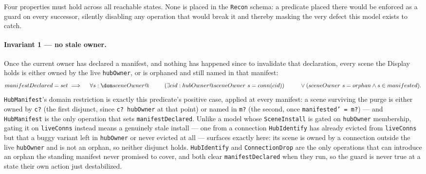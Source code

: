 \documentclass[a4paper,10pt,fleqn]{article}
\begin{document}
Four properties must hold across all reachable states.  None is placed in
the \texttt{Recon} schema: a predicate placed there would be enforced as a
guard on every successor, silently disabling any operation that would
break it and thereby masking the very defect this model exists to catch.

\paragraph{Invariant 1 --- no stale owner.}
Once the current owner has declared a manifest, and nothing has happened
since to invalidate that declaration, every scene the Display holds is
either owned by the live \texttt{hubOwner}, or is orphaned and still named
in that manifest:
\[
  manifestDeclared = set \implies \\
  \quad~ \forall s : \dom sceneOwner @ \\
  \quad~ \quad~ (\exists cid : hubOwner @ sceneOwner~s = conn(cid)) \\
  \quad~ \quad~ \lor (sceneOwner~s = orphan \land s \in manifested).
\]
\texttt{HubManifest}'s domain restriction is exactly this predicate's
positive case, applied at every manifest: a scene surviving the purge is
either owned by \texttt{c?} (the first disjunct, since
\texttt{c? \in hubOwner} at that point) or named in \texttt{m?} (the
second, once \texttt{manifested' = m?}) --- and \texttt{HubManifest} is the
only operation that sets \texttt{manifestDeclared}.  Unlike a model whose
\texttt{SceneInstall} is gated on \texttt{hubOwner} membership, gating it
on \texttt{liveConns} instead means a genuinely stale install --- one from
a connection \texttt{HubIdentify} has already evicted from
\texttt{liveConns} but that a buggy variant left in \texttt{hubOwner} or
never evicted at all --- surfaces exactly here: its scene is owned by a
connection outside the live \texttt{hubOwner} and is not an orphan, so
neither disjunct holds.  \texttt{HubIdentify} and \texttt{ConnectionDrop}
are the only operations that can introduce an orphan the standing
manifest never promised to cover, and both clear \texttt{manifestDeclared}
when they run, so the guard is never true at a state their own action
just destabilized.
\end{document}
